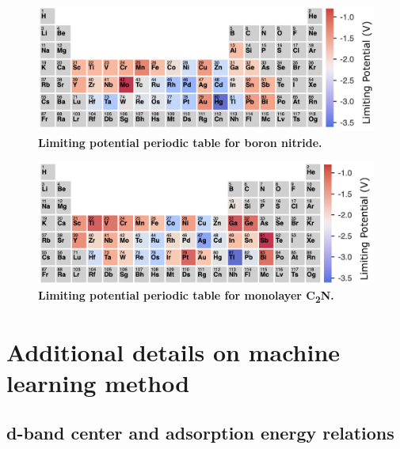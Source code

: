 \begin{figure}[htbp]
  \centering
  \includegraphics[width=\textwidth]{supp_fig16_BN_ptable.png}
  \caption{\textbf{Limiting potential periodic table for boron nitride.}}
  \label{supp_fig16:BN_ptable}
\end{figure}

\begin{figure}[htbp]
  \centering
  \includegraphics[width=\textwidth]{supp_fig17_C2N_ptable.png}
  \caption{\textbf{Limiting potential periodic table for monolayer C\textsubscript{2}N.}}
  \label{supp_fig17:C2N_ptable}
\end{figure}

\newpage

\section{Additional details on machine learning method}

\subsection{d-band center and adsorption energy relations}
\label{supp_sec3.1_dband_eads}

